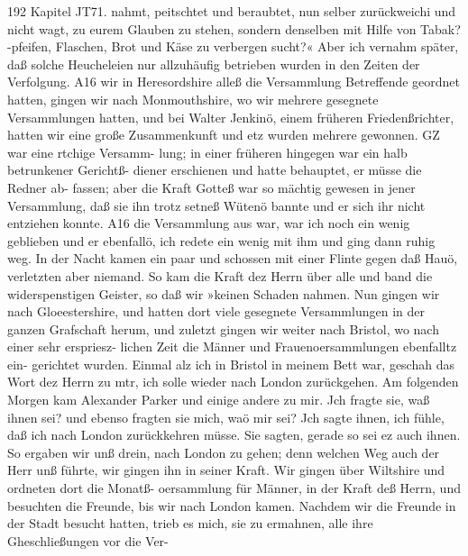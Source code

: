 192 Kapitel JT71.
nahmt, peitschtet und beraubtet, nun selber zurückweichi und nicht
wagt, zu eurem Glauben zu stehen, sondern denselben mit Hilfe
von Tabak?-pfeifen, Flaschen, Brot und Käse zu verbergen sucht?«
Aber ich vernahm später, daß solche Heucheleien nur allzuhäufig
betrieben wurden in den Zeiten der Verfolgung.
A16 wir in Heresordshire alleß die Versammlung Betreffende
geordnet hatten, gingen wir nach Monmouthshire, wo wir mehrere
gesegnete Versammlungen hatten, und bei Walter Jenkinö, einem
früheren Friedenßrichter, hatten wir eine große Zusammenkunft
und etz wurden mehrere gewonnen. GZ war eine rtchige Versamm-
lung; in einer früheren hingegen war ein halb betrunkener Gerichtß-
diener erschienen und hatte behauptet, er müsse die Redner ab-
fassen; aber die Kraft Gotteß war so mächtig gewesen in jener
Versammlung, daß sie ihn trotz setneß Wütenö bannte und er sich
ihr nicht entziehen konnte. A16 die Versammlung aus war, war
ich noch ein wenig geblieben und er ebenfallö, ich redete ein
wenig mit ihm und ging dann ruhig weg. In der Nacht kamen
ein paar und schossen mit einer Flinte gegen daß Hauö, verletzten
aber niemand. So kam die Kraft dez Herrn über alle und
band die widerspenstigen Geister, so daß wir »keinen Schaden
nahmen.
Nun gingen wir nach Gloeestershire, und hatten dort viele
gesegnete Versammlungen in der ganzen Grafschaft herum, und
zuletzt gingen wir weiter nach Bristol, wo nach einer sehr erspriesz-
lichen Zeit die Männer und Frauenoersammlungen ebenfalltz ein-
gerichtet wurden.
Einmal alz ich in Bristol in meinem Bett war, geschah das
Wort dez Herrn zu mtr, ich solle wieder nach London zurückgehen.
Am folgenden Morgen kam Alexander Parker und einige andere
zu mir. Jch fragte sie, waß ihnen sei? und ebenso fragten sie
mich, waö mir sei? Jch sagte ihnen, ich fühle, daß ich nach
London zurückkehren müsse. Sie sagten, gerade so sei ez auch
ihnen. So ergaben wir unß drein, nach London zu gehen; denn
welchen Weg auch der Herr unß führte, wir gingen ihn in seiner
Kraft. Wir gingen über Wiltshire und ordneten dort die Monatß-
oersammlung für Männer, in der Kraft deß Herrn, und besuchten
die Freunde, bis wir nach London kamen.
Nachdem wir die Freunde in der Stadt besucht hatten, trieb
es mich, sie zu ermahnen, alle ihre Gheschließungen vor die Ver-


